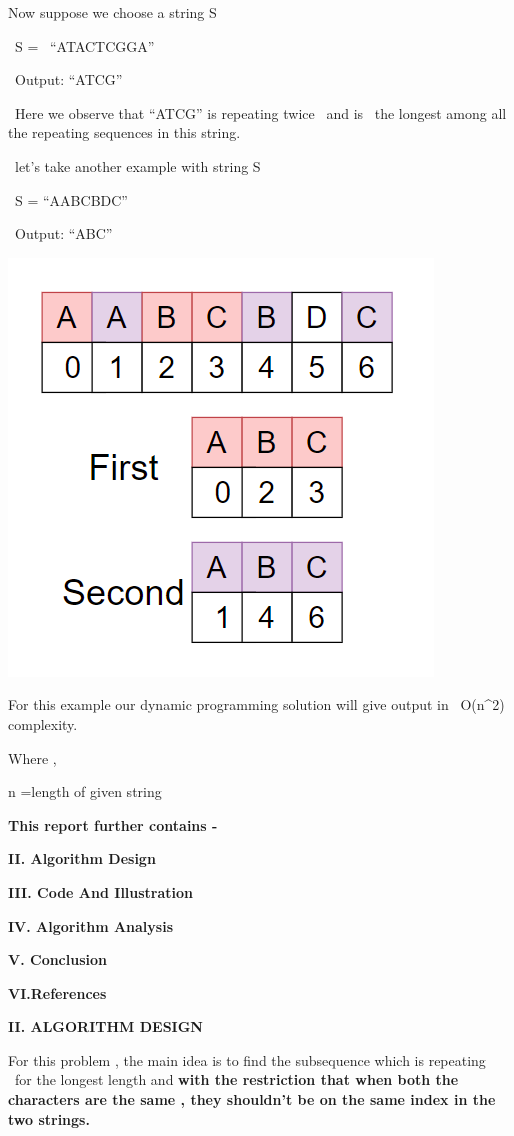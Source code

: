 \documentclass[letterpaper]{article}
\begin{document}
\begin{multicols}{2}
Now suppose we choose a string S

\ S = \ {}``ATACTCGGA''

\ Output: ``ATCG''

\ Here we observe that ``ATCG'' is repeating twice \ and is \ the longest among all the repeating sequences in this
string.

\ let's take another example with string S

\ S = ``AABCBDC''

\ Output: ``ABC''

\includegraphics[scale=0.4]{string}

For this example our dynamic programming solution will give output in \ O(n\^{}2) complexity.

Where ,

n =length of given string 

{\bfseries
This report further contains -}

{\bfseries
II. Algorithm Design}

{\bfseries
III. Code And Illustration}

{\bfseries
IV. Algorithm Analysis}

{\bfseries
V. Conclusion}

{\bfseries
VI.References}


\bigskip

{\bfseries
II. ALGORITHM DESIGN}


\bigskip

For this problem , the main idea is to find the subsequence which is repeating \ for the longest length and \textbf{with
the restriction that when both the characters are the same , they shouldn't be on the same index in the two strings. }


\end{multicols}
\end{document}
